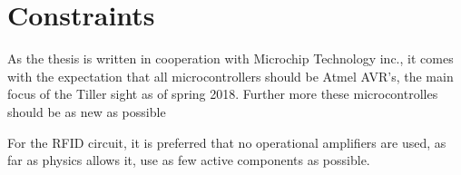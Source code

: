 \section{Constraints}

As the thesis is written in cooperation with Microchip Technology inc., it comes with the expectation that all microcontrollers should be Atmel AVR's, the main focus of the Tiller sight as of spring 2018. Further more these microcontrolles should be as new as possible

For the RFID circuit, it is preferred that no operational amplifiers are used, as far as physics allows it, use as few active components as possible.